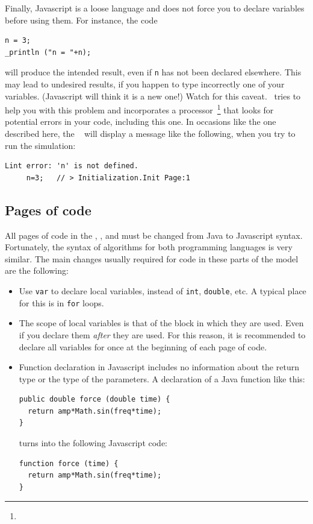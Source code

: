 Finally, Javascript is a loose language and does not force you to declare variables before using them. For instance, the code
\begin{verbatim}
n = 3;
_println ("n = "+n);
\end{verbatim}
\noindent will produce the intended result, even if \verb?n? has not been declared elsewhere. This may lead to undesired results, if you happen to type incorrectly one of your variables. (Javascript will think it is a new one!) Watch for this caveat. \ejs\ tries to help you with this problem and incorporates a  processor~\footnote{} that looks for potential errors in your code, including this one. In occasions like the one described here, the \ejs\  will display a message like the following, when you try to run the simulation:
\begin{verbatim}
Lint error: 'n' is not defined.
     n=3;   // > Initialization.Init Page:1
\end{verbatim}

\subsection{Pages of code}

All pages of code in the , ,  and  must be changed from Java to Javascript syntax. Fortunately, the syntax of algorithms for both programming languages is very similar. The main changes usually required for code in these parts of the model are the following:
\begin{itemize}
  \item Use \verb?var? to declare local variables, instead of \verb?int?, \verb?double?, etc. A typical place for this is in \verb?for? loops.
  \item The scope of local variables is that of the block in which they are used. Even if you declare them \emph{after} they are used. For this reason, it is recommended to declare all variables for once at the beginning of each page of code.
  \item Function declaration in Javascript includes no information about the return type or the type of the parameters. A declaration of a Java function like this:
\begin{verbatim}
public double force (double time) {
  return amp*Math.sin(freq*time); 
}
\end{verbatim}
\noindent turns into the following Javascript code:
\begin{verbatim}
function force (time) {
  return amp*Math.sin(freq*time); 
}
\end{verbatim}
\end{itemize}

